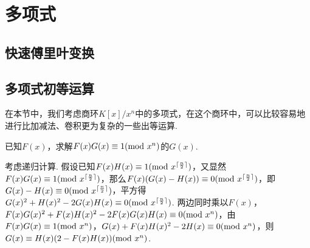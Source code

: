 \section{多项式}

\subsection{快速傅里叶变换}

\subsection{多项式初等运算}
在本节中，我们考虑商环$K[x]/x^n$中的多项式，在这个商环中，可以比较容易地进行比加减法、卷积更为复杂的一些出等运算.

\begin{problem}[多项式求逆]
	已知$F(x)$，求解$F(x)G(x)\equiv1({\rm mod\ } x^n)$的$G(x)$.
\end{problem}

\begin{algorithm}
	考虑递归计算. 假设已知$F(x)H(x)\equiv1({\rm mod\ } x^{\lceil\frac{n}{2}\rceil})$，又显然$F(x)G(x)\equiv1({\rm mod\ } x^{\lceil\frac{n}{2}\rceil})$，那么$F(x)(G(x)-H(x))\equiv0({\rm mod\ } x^{\lceil\frac{n}{2}\rceil})$，即$G(x)-H(x)\equiv0({\rm mod\ } x^{\lceil\frac{n}{2}\rceil})$，平方得$G(x)^2+H(x)^2-2G(x)H(x)\equiv0({\rm mod\ } x^{\lceil\frac{n}{2}\rceil})$. 两边同时乘以$F(x)$，$F(x)G(x)^2+F(x)H(x)^2-2F(x)G(x)H(x)\equiv0({\rm mod\ } x^n)$，由$F(x)G(x)\equiv1({\rm mod\ } x^n)$，$G(x)+F(x)H(x)^2-2H(x)\equiv0({\rm mod\ } x^n)$，则$G(x)\equiv H(x)(2-F(x)H(x))({\rm mod\ } x^n)$.
\end{algorithm}